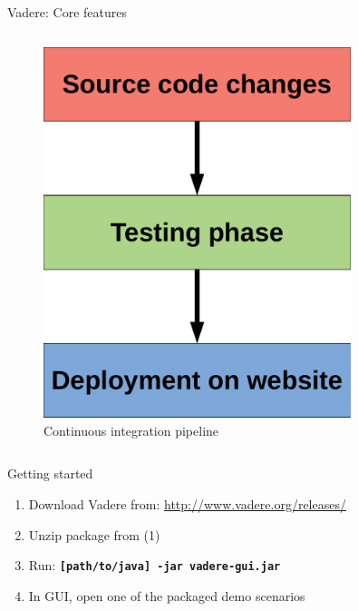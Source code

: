 \documentclass[compress,t,usenames,xcolor=dvipsnames]{beamer}
\begin{document}
\begin{frame}{Vadere: Core features \hfill \hyperlink{BackupSlides}{}}
\begin{columns}
\begin{column}{0.45\textwidth}
{\begin{figure}
                    \centering
                    \includegraphics[width=0.8\textwidth]{ContinuousIntegration/CI-Steps}
                    \caption{Continuous integration pipeline}
                    \label{fig:CISteps}
                \end{figure}
            }
        \end{column}
    \end{columns}
    
\end{frame}

\begin{frame}{Getting started}
    
    \begin{enumerate}
        
        \item Download Vadere from: \url{http://www.vadere.org/releases/} 
        \item Unzip package from (1)
        \item Run: \textbf{\texttt{[path/to/java] -jar vadere-gui.jar}}
        \item In GUI, open one of the packaged demo scenarios
    \end{enumerate}
    
\end{frame}
\end{document}
